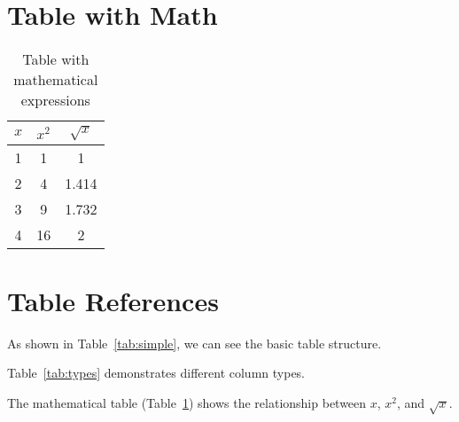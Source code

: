 \documentclass{article}
\begin{document}
\section{Table with Math}
\begin{table}[h]
\centering
\begin{tabular}{|c|c|c|}
\hline
$x$ & $x^2$ & $\sqrt{x}$ \\
\hline
1 & 1 & 1 \\
2 & 4 & 1.414 \\
3 & 9 & 1.732 \\
4 & 16 & 2 \\
\hline
\end{tabular}
\caption{Table with mathematical expressions}
\label{tab:math}
\end{table}

\section{Table References}
As shown in Table~\ref{tab:simple}, we can see the basic table structure.

Table~\ref{tab:types} demonstrates different column types.

The mathematical table (Table~\ref{tab:math}) shows the relationship between $x$, $x^2$, and $\sqrt{x}$.
\end{document}
